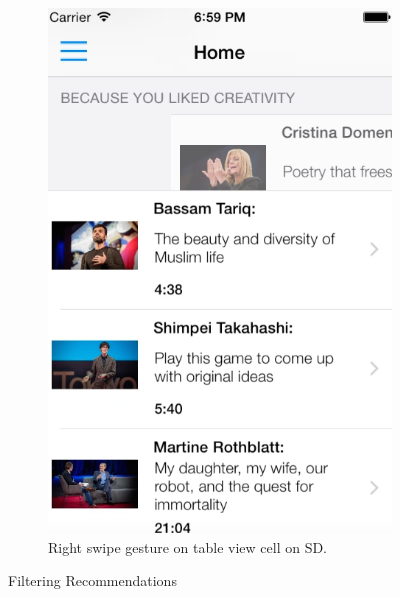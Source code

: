 \begin{figure}[!htpb]
\begin{subfigure}[b]{0.3\textwidth}
        \includegraphics[width=\textwidth]{figures/swiperightSD}
        \caption{Right swipe gesture on table view cell on SD.}
        \label{fig:figure47b}
    \end{subfigure}
   \caption{Filtering Recommendations}\label{fig:figure47}
\end{figure} 
         


